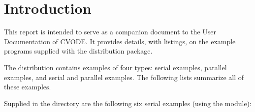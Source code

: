 \section{Introduction}\label{s:ex_intro}

This report is intended to serve as a companion document to the User
Documentation of CVODE.  It provides details, with listings, on
the example programs supplied with the {\cvode} distribution package.

The {\cvode} distribution contains examples of four types: serial
{\C} examples, parallel {\C} examples, and serial and parallel {\F}
examples.  The following lists summarize all of these examples.

Supplied in the  directory are the
following six serial examples (using the {\nvecs} module):

